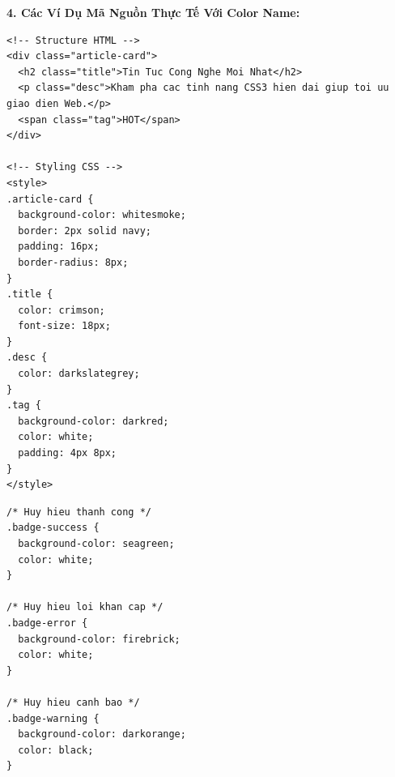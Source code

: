 \documentclass[11pt,oneside]{book}
\begin{document}
\textbf{4. Các Ví Dụ Mã Nguồn Thực Tế Với Color Name:}

\begin{codeWindow}
\begin{lstlisting}[language=HTML5]
<!-- Structure HTML -->
<div class="article-card">
  <h2 class="title">Tin Tuc Cong Nghe Moi Nhat</h2>
  <p class="desc">Kham pha cac tinh nang CSS3 hien dai giup toi uu giao dien Web.</p>
  <span class="tag">HOT</span>
</div>

<!-- Styling CSS -->
<style>
.article-card {
  background-color: whitesmoke;
  border: 2px solid navy;
  padding: 16px;
  border-radius: 8px;
}
.title {
  color: crimson;
  font-size: 18px;
}
.desc {
  color: darkslategrey;
}
.tag {
  background-color: darkred;
  color: white;
  padding: 4px 8px;
}
</style>
\end{lstlisting}
\end{codeWindow}

\begin{codeWindow}
\begin{lstlisting}[language=CSS3]
/* Huy hieu thanh cong */
.badge-success {
  background-color: seagreen;
  color: white;
}

/* Huy hieu loi khan cap */
.badge-error {
  background-color: firebrick;
  color: white;
}

/* Huy hieu canh bao */
.badge-warning {
  background-color: darkorange;
  color: black;
}
\end{lstlisting}
\end{codeWindow}
\end{document}
